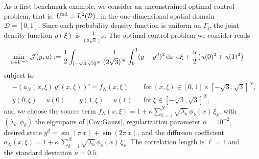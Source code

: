 \documentclass[a4paper,10pt]{article}
\newcommand{\cD}{{\mathcal{D}}}
\renewcommand{\d}{\textup{d}}
\numberwithin{theorem}{section}
\begin{document}
As a first benchmark example, we consider an unconstrained optimal control problem, that is, $U^{\textup{ad}} = L^2(\cD)$, in the one-dimensional spatial 
domain $\mathcal{D}=[0,1]$. Since each probability density function is uniform on $\Gamma_i$, the joint density function $\rho(\xi)$ is $ \frac{1}{(2\sqrt{3})^N}$. The optimal 
control problem we consider reads
\begin{eqnarray*}
	\min \limits_{u \in U^{\textup{ad}}} \; \mathcal{J}(y,u) := \frac{1}{2} \int_{[-\sqrt{3},\sqrt{3}]^N} \frac{1}{(2\sqrt{3})^N}  \int_0^1 (y-y^d)^2 \, \d x \, \, \d\xi 
        +  \frac{\alpha}{2} \big( u(0)^2 + u(1)^2 \big)
\end{eqnarray*}
subject to 
  \begin{align*}
    &-(a_N(x,\xi) \, y'(x, \xi))' = f_N(x,\xi)    &&             \text{for}\ (x,\xi) \in  [0,1]         \times [-\sqrt{3},\sqrt{3}]^N,\\
    & y(0, \xi) =  u(0) \qquad  y(1, \xi) =  u(1)   &&     \text{for}\ \xi  \in [-\sqrt{3},\sqrt{3}]^N,
  \end{align*}  
and we choose the source term $f_N(x,\xi) = 1 + \kappa \sum_{k=1}^{N}\sqrt{\lambda_k}\,\phi_k(x)\,\xi_k$, with $(\lambda_k,\phi_k)$ the eigenpairs of \eqref{Cov:Gauss}, regularization parameter $\alpha=10^{-2}$, desired state $y^d = \sin(\pi \,x) + \sin(2\pi \,x)$, and the diffusion coefficient $a_N(x,\xi) = 1 + \kappa\,\sum_{k=1}^{N} \sqrt{\lambda_k}\,\phi_k(x)\,\xi_k$. The correlation length is $\ell=1$ and the standard deviation $\kappa=0.5$.
\end{document}
